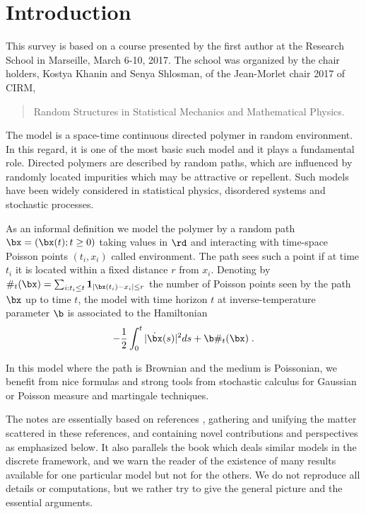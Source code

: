 \chapter{Introduction}

This survey is based on a course presented by the first author at the Research School in Marseille, March 6-10, 2017. 
The school was organized by the chair holders, Kostya Khanin and Senya Shlosman, of the Jean-Morlet chair 2017 of CIRM,
\begin{quotation}
Random Structures in Statistical Mechanics and Mathematical Physics.
\end{quotation}
The model is a space-time continuous directed polymer in random environment. 
In this regard, it is one of the most basic such model and it plays a fundamental
role. %
Directed polymers are described by random paths, which are influenced by randomly located impurities which may be attractive or repellent.
Such models have been widely considered in statistical physics, disordered systems and stochastic processes. 

\medskip


As an informal definition we model the polymer by a random path $\bx=(\bx(t); t \geq 0)$ taking values in $\rd$ and interacting with time-space Poisson points $(t_i, x_i)$ called environment. The path sees such a point if at time $t_i$ it is located within a fixed distance $r$ from $x_i$. Denoting by $\#_t(\bx)= \sum_{i: t_i\leq t}  {\bf 1}_{|\bx(t_i)-x_i|\leq r}$ the number of  Poisson points seen by the path $\bx$ up to time $t$,
the model with time horizon $t$ at inverse-temperature parameter $\b$ is associated to the Hamiltonian 
$$
-\frac 12 \int_0^t |\dot \bx (s)|^2 ds + \b \#_t(\bx)\;.
$$


In this model where the path is Brownian and the medium is Poissonian,  we benefit from nice formulas and strong tools from stochastic calculus for
Gaussian or Poisson measure and martingale techniques. 
\medskip


The notes are essentially based on references \cite{CY05, CYkokyuroku, CYBMPO2,CoscoIntermediate}, gathering and unifying the matter scattered in these references, and containing novel contributions and perspectives as emphasized below. It also parallels the book \cite{CStFlour} which deals similar models in the  discrete framework, and we warn the reader of the existence of many results available for one 
particular model but  not for the others. We do not reproduce all details or computations, but we rather try to give the general picture and the essential arguments. 
\medskip

